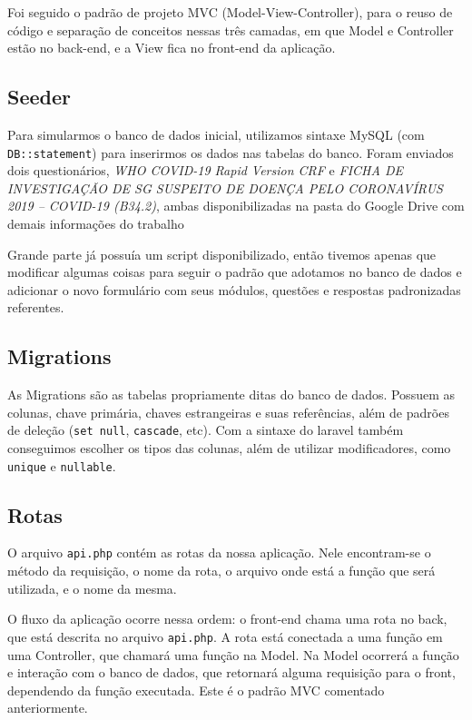 \documentclass[12pt]{article}
\begin{document}
Foi seguido o padrão de projeto MVC (Model-View-Controller),
para o reuso de código e separação de conceitos
nessas três camadas, em que Model e Controller
estão no back-end, e a View fica
no front-end da aplicação.

\subsection{Seeder}

Para simularmos o banco de dados inicial,
utilizamos sintaxe MySQL (com \texttt{DB::statement})
para inserirmos os dados nas tabelas do banco.
Foram enviados dois questionários,
\textit{WHO COVID-19 Rapid Version CRF} e
\textit{FICHA DE INVESTIGAÇÃO DE SG SUSPEITO
DE DOENÇA PELO CORONAVÍRUS 2019 – COVID-19 (B34.2)},
ambas disponibilizadas na pasta do
Google Drive com demais informações do trabalho

Grande parte já possuía um script disponibilizado,
então tivemos apenas que modificar algumas coisas
para seguir o padrão que adotamos no banco de dados
e adicionar o novo formulário com seus módulos,
questões e respostas padronizadas referentes.

\subsection{Migrations}

As Migrations são as tabelas propriamente ditas
do banco de dados. Possuem as colunas, chave primária,
chaves estrangeiras e suas referências,
além de padrões de deleção (\texttt{set null},
\texttt{cascade}, etc).
Com a sintaxe do laravel também conseguimos
escolher os tipos das colunas, além de utilizar
modificadores, como \texttt{unique} e \texttt{nullable}.

\subsection{Rotas}

O arquivo \texttt{api.php} contém as rotas da nossa aplicação.
Nele encontram-se o método da requisição,
o nome da rota, o arquivo onde está a função
que será utilizada, e o nome da mesma.

O fluxo da aplicação ocorre nessa ordem:
o front-end chama uma rota no back,
que está descrita no arquivo \texttt{api.php}.
A rota está conectada a uma função em uma Controller,
que chamará uma função na Model.
Na Model ocorrerá a função e interação
com o banco de dados, que retornará
alguma requisição para o front,
dependendo da função executada.
Este é o padrão MVC comentado anteriormente.
\end{document}
